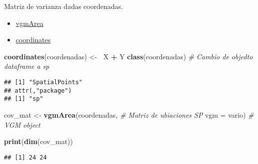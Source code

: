 \documentclass[ignorenonframetext,]{beamer}
\newenvironment{Shaded}{\begin{snugshade}}{\end{snugshade}}
\newcommand{\CommentTok}[1]{\textcolor[rgb]{0.56,0.35,0.01}{\textit{#1}}}
\newcommand{\DataTypeTok}[1]{\textcolor[rgb]{0.13,0.29,0.53}{#1}}
\newcommand{\ErrorTok}[1]{\textcolor[rgb]{0.64,0.00,0.00}{\textbf{#1}}}
\newcommand{\KeywordTok}[1]{\textcolor[rgb]{0.13,0.29,0.53}{\textbf{#1}}}
\newcommand{\NormalTok}[1]{#1}
\newcommand{\OperatorTok}[1]{\textcolor[rgb]{0.81,0.36,0.00}{\textbf{#1}}}
\newcommand{\StringTok}[1]{\textcolor[rgb]{0.31,0.60,0.02}{#1}}
\providecommand{\tightlist}{%
  \setlength{\itemsep}{0pt}\setlength{\parskip}{0pt}}
\begin{document}
\begin{frame}[fragile]{Matriz de varianza dadas coordenadas.}
\protect\hypertarget{matriz-de-varianza-dadas-coordenadas.}{}

\begin{itemize}
\tightlist
\item
  \href{https://cran.r-project.org/web/packages/gstat/gstat.pdf\#page=78}{vgmArea}
\item
  \href{https://cran.r-project.org/web/packages/sp/sp.pdf\#page=16}{coordinates}
\end{itemize}

\begin{Shaded}
\begin{Highlighting}[]
\KeywordTok{coordinates}\NormalTok{(coordenadas) <-}\StringTok{ }\ErrorTok{~}\NormalTok{X }\OperatorTok{+}\StringTok{ }\NormalTok{Y}
\KeywordTok{class}\NormalTok{(coordenadas) }\CommentTok{# Cambio de objedto dataframe a sp}
\end{Highlighting}
\end{Shaded}

\begin{verbatim}
## [1] "SpatialPoints"
## attr(,"package")
## [1] "sp"
\end{verbatim}

\begin{Shaded}
\begin{Highlighting}[]
\NormalTok{cov_mat <-}\StringTok{ }\KeywordTok{vgmArea}\NormalTok{(coordenadas, }\CommentTok{# Matriz de ubiaciones SP}
        \DataTypeTok{vgm =}\NormalTok{ vario) }\CommentTok{# VGM object}

\KeywordTok{print}\NormalTok{(}\KeywordTok{dim}\NormalTok{(cov_mat))}
\end{Highlighting}
\end{Shaded}

\begin{verbatim}
## [1] 24 24
\end{verbatim}

\end{frame}
\end{document}
